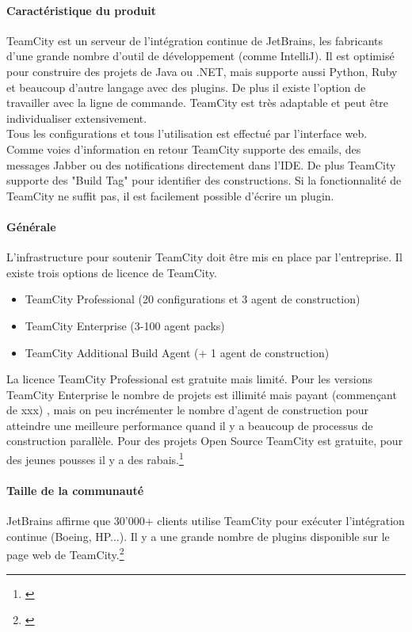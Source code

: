 \paragraph{Caractéristique du produit} TeamCity est un serveur de l'intégration continue de JetBrains, les fabricants d'une grande nombre d'outil de développement (comme IntelliJ). Il est optimisé pour construire des projets de Java ou .NET, mais supporte aussi Python, Ruby et beaucoup d'autre langage avec des plugins. De plus il existe l'option de travailler avec la ligne de commande. TeamCity est très adaptable et peut être individualiser extensivement. \\
Tous les configurations et tous l'utilisation est effectué par l'interface web. Comme voies d'information en retour TeamCity supporte des emails, des messages Jabber ou des notifications directement dans l'IDE. De plus TeamCity supporte des "Build Tag" pour identifier des constructions. Si la fonctionnalité de TeamCity ne suffit pas, il est facilement possible d'écrire un plugin.

\paragraph{Générale} L'infrastructure pour soutenir TeamCity doit être mis en place par l'entreprise. Il existe trois options de licence de TeamCity.
\begin{itemize}
	\item TeamCity Professional (20 configurations et 3 agent de construction)
	\item TeamCity Enterprise (3-100 agent packs)
	\item TeamCity Additional Build Agent (+ 1 agent de construction)
\end{itemize}
La licence TeamCity Professional est gratuite mais limité. Pour les versions TeamCity Enterprise le nombre de projets est illimité mais payant (commençant de xxx) , mais on peu incrémenter le nombre d'agent de construction pour atteindre une meilleure performance quand il y a beaucoup de processus de construction parallèle. Pour des projets Open Source TeamCity est gratuite, pour des jeunes pousses il y a des rabais.\footnote{\citep{teamcitybuy}}
\paragraph{Taille de la communauté}
JetBrains affirme que 30'000+ clients utilise TeamCity pour exécuter l'intégration continue (Boeing, HP...). Il y a une grande nombre de plugins disponible sur le page web de TeamCity.\footnote{\citep{teamcityplugins}}
